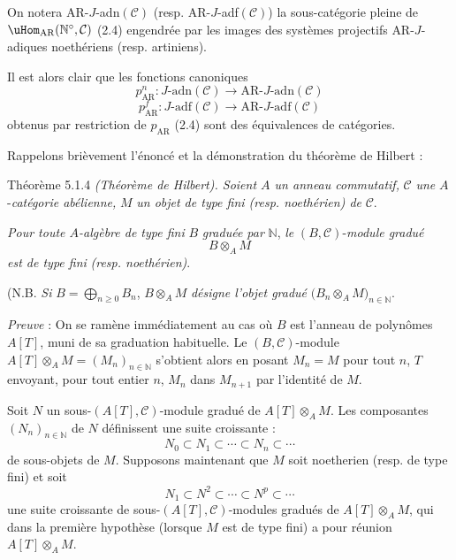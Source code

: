 On notera AR-\(J\)-adn\((\mathcal{C})\) (resp. AR-\(J\)-adf\((\mathcal{C})\)) la sous-catégorie pleine de \(\uHom_{\mathrm{AR}}(\mathbb{N}^\circ,\mathcal{C})\) (2.4) engendrée par les images des systèmes projectifs AR-\(J\)-adiques noethériens (resp. artiniens).

Il est alors clair que les fonctions canoniques
\[
p^n_{\mathrm{AR}}:J\text{-adn}(\mathcal{C})\longrightarrow \mathrm{AR}\text{-}J\text{-adn}(\mathcal{C})
\]
\[
p^f_{\mathrm{AR}}:J\text{-adf}(\mathcal{C})\longrightarrow \mathrm{AR}\text{-}J\text{-adf}(\mathcal{C})
\]
obtenus par restriction de \(p_{\mathrm{AR}}\) (2.4) sont des équivalences de catégories.

Rappelons brièvement l'énoncé et la démonstration du théorème de Hilbert :

\begin{statement}{Théorème 5.1.4}
\emph{(Théorème de Hilbert). Soient \(A\) un anneau commutatif,} \(\mathcal{C}\) \emph{une} \(A\)-\emph{catégorie abélienne,} \(M\) \emph{un objet de type fini (resp. noethérien) de} \(\mathcal{C}\).

\emph{Pour toute \(A\)-algèbre de type fini} \(B\) \emph{graduée par} \(\mathbb{N}\), \emph{le} \((B,\mathcal{C})\)-\emph{module gradué}
\[
B\otimes_A M
\]
\emph{est de type fini} \emph{(resp. noethérien)}.

(N.B. \emph{Si} \(B=\bigoplus_{n\ge0}B_n\), \(B\otimes_A M\) \emph{désigne l'objet gradué} \(\bigl(B_n\otimes_A M\bigr)_{n\in\mathbb{N}}\).
\end{statement}

\emph{Preuve} : On se ramène immédiatement au cas où \(B\) est l'anneau de polynômes \(A[T]\), muni de sa graduation habituelle. Le \((B,\mathcal{C})\)-module \(A[T]\otimes_A M=(M_n)_{n\in\mathbb{N}}\) s'obtient alors en posant \(M_n=M\) pour tout \(n\), \(T\) envoyant, pour tout entier \(n\), \(M_n\) dans \(M_{n+1}\) par l'identité de \(M\).

Soit \(N\) un sous-\((A[T],\mathcal{C})\)-module gradué de \(A[T]\otimes_A M\). Les composantes \((N_n)_{n\in\mathbb{N}}\) de \(N\) définissent une suite croissante :
\[
N_0\subset N_1\subset\cdots\subset N_n\subset\cdots
\]
de
sous-objets de \(M\). Supposons maintenant que \(M\) soit noetherien (resp. de type fini) et soit
\[
N_1\subset N^2\subset\cdots\subset N^p\subset\cdots
\]
une suite croissante de sous-\((A[T],\mathcal{C})\)-modules gradués de \(A[T]\otimes_A M\), qui dans la première hypothèse (lorsque \(M\) est de type fini) a pour réunion \(A[T]\otimes_A M\).

